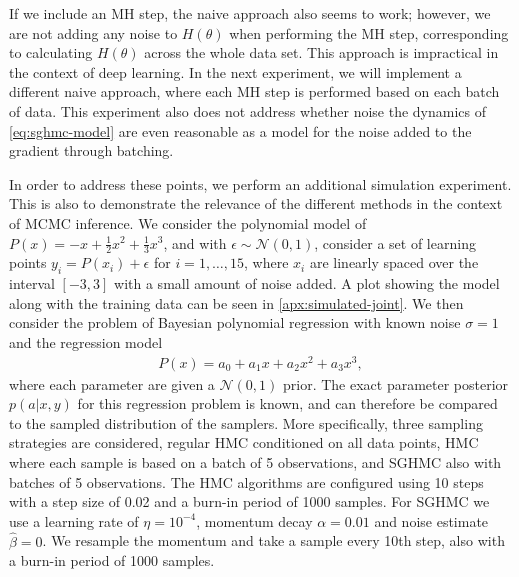 If we include an MH step, the naive approach also seems to work; however, we are not adding any noise to $H(\theta)$ when performing the MH step, corresponding to calculating $H(\theta)$ across the whole data set. 
This approach is impractical in the context of deep learning.
In the next experiment, we will implement a different naive approach, where each MH step is performed based on each batch of data. 
This experiment also does not address whether noise the dynamics of \cref{eq:sghmc-model} are even reasonable as a model for the noise added to the gradient through batching. 

In order to address these points, we perform an additional simulation experiment. 
This is also to demonstrate the relevance of the different methods in the context of MCMC inference.
We consider the polynomial model of $P(x) = -x + \frac{1}{2}x^2 + \frac{1}{3}x^3$, 
and with $\epsilon \sim \mathcal{N}(0, 1)$, consider a set of learning points $y_i = P(x_i) + \epsilon$ for $i=1,\dots,15$, where $x_i$ are linearly spaced over the interval $[-3, 3]$ with a small amount of noise added. 
A plot showing the model along with the training data can be seen in \cref{apx:simulated-joint}.
We then consider the problem of Bayesian polynomial regression with known noise $\sigma=1$ and the regression model
\begin{align}
    P(x) = a_0 + a_1 x+a_2 x^2 + a_3 x^3,
\end{align}
where each parameter are given a $\mathcal{N}(0, 1)$ prior.
The exact parameter posterior $p(a|x,y)$ for this regression problem is known, and can therefore be compared to the sampled distribution of the samplers. 
More specifically, three sampling strategies are considered, regular HMC conditioned on all data points, HMC where each sample is based on a batch of 5 observations, and SGHMC also with batches of 5 observations.
The HMC algorithms are configured using 10 steps with a step size of 0.02 and a burn-in period of 1000 samples.
For SGHMC we use a learning rate of $\eta=10^{-4}$, momentum decay $\alpha=0.01$ and noise estimate $\hat\beta=0$.
We resample the momentum and take a sample every 10th step, also with a burn-in period of 1000 samples. 

